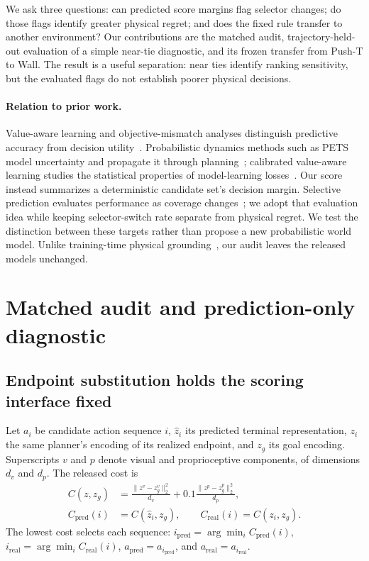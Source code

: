 \documentclass{article}
\begin{document}
We ask three questions: can predicted score margins flag selector changes;
do those flags identify greater physical regret; and does the fixed rule
transfer to another environment? Our contributions are the matched audit,
trajectory-held-out evaluation of a simple near-tie diagnostic, and its frozen
transfer from Push-T to Wall. The result is a useful separation: near ties
identify ranking sensitivity, but the evaluated flags do not establish poorer
physical decisions.

\paragraph{Relation to prior work.}
Value-aware learning and objective-mismatch analyses distinguish predictive
accuracy from decision utility~\citep{pmlr-v54-farahmand17a,pmlr-v120-lambert20a}.
Probabilistic dynamics methods such as PETS model uncertainty and propagate it
through planning~\citep{chua2018pets}; calibrated value-aware learning studies
the statistical properties of model-learning losses~\citep{pmlr-v267-voelcker25a}.
Our score instead summarizes a deterministic candidate set's decision margin.
Selective prediction evaluates performance as coverage changes~\citep{geifman2019selective};
we adopt that evaluation idea while keeping selector-switch rate separate from
physical regret. We test the distinction between these targets rather than
propose a new probabilistic world model. Unlike training-time physical
grounding~\citep{liu2026grounded}, our audit leaves the released models unchanged.

\section{Matched audit and prediction-only diagnostic}

\subsection{Endpoint substitution holds the scoring interface fixed}

Let $a_i$ be candidate action sequence $i$, $\hat z_i$ its predicted terminal
representation, $z_i$ the same planner's encoding of its realized endpoint,
and $z_g$ its goal encoding. Superscripts $v$ and $p$ denote visual and
proprioceptive components, of dimensions $d_v$ and $d_p$. The released cost is
\begin{equation}
 \begin{aligned}
 C(z,z_g)&=\frac{\|z^v-z_g^v\|_2^2}{d_v}
           +0.1\frac{\|z^p-z_g^p\|_2^2}{d_p},\\
 C_{\mathrm{pred}}(i)&=C(\hat z_i,z_g),\qquad
 C_{\mathrm{real}}(i)=C(z_i,z_g).
 \end{aligned}
 \label{eq:cost}
\end{equation}
The lowest cost selects each sequence:
$i_{\mathrm{pred}}=\arg\min_i C_{\mathrm{pred}}(i)$,
$i_{\mathrm{real}}=\arg\min_i C_{\mathrm{real}}(i)$,
$a_{\mathrm{pred}}=a_{i_{\mathrm{pred}}}$, and
$a_{\mathrm{real}}=a_{i_{\mathrm{real}}}$.
\end{document}
